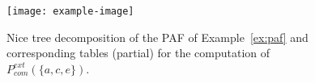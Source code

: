 \documentclass{article}
\begin{document}
\begin{figure}[t]
\centering
\texttt{[image: example-image]}
\caption{Nice tree decomposition of the PAF of Example~\ref{ex:paf} and corresponding tables (partial) for the computation of $P^{\mathit{ext}}_{com}(\{a, c, e\})$.}
\label{fig:exp_example}
\end{figure}
\end{document}
